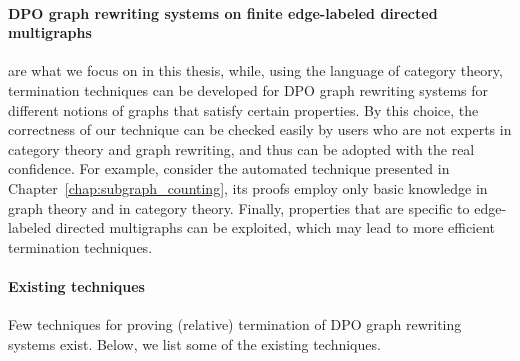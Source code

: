 \paragraph{DPO graph rewriting systems on finite edge-labeled directed multigraphs} are what we focus on in this thesis, while, using the language of category theory, termination techniques can be developed for DPO graph rewriting systems for different notions of graphs that satisfy certain properties.
 By this choice, the correctness of our technique can be checked easily by users who are not experts in category theory and graph rewriting, and thus can be adopted with the real confidence. For example, consider the automated technique presented in Chapter~\ref{chap:subgraph_counting}, its proofs employ only basic knowledge in graph theory and in category theory.
 Finally, properties that are specific to edge-labeled directed multigraphs can be exploited, which may lead to more efficient termination techniques.
 
\paragraph{Existing techniques}
Few techniques for proving (relative) termination of DPO graph rewriting systems exist. Below, we list some of the existing techniques.

